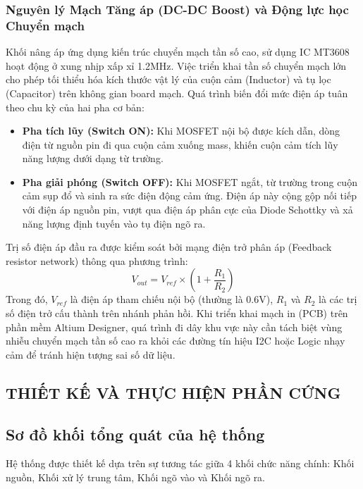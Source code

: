 \documentclass[12pt, a4paper, oneside]{article}
\begin{document}
\subsubsection{Nguyên lý Mạch Tăng áp (DC-DC Boost) và Động lực học Chuyển mạch}
Khối nâng áp ứng dụng kiến trúc chuyển mạch tần số cao, sử dụng IC MT3608 hoạt động ở xung nhịp xấp xỉ 1.2MHz. Việc triển khai tần số chuyển mạch lớn cho phép tối thiểu hóa kích thước vật lý của cuộn cảm (Inductor) và tụ lọc (Capacitor) trên không gian board mạch. Quá trình biến đổi mức điện áp tuân theo chu kỳ của hai pha cơ bản:
\begin{itemize}
    \item \textbf{Pha tích lũy (Switch ON):} Khi MOSFET nội bộ được kích dẫn, dòng điện từ nguồn pin đi qua cuộn cảm xuống mass, khiến cuộn cảm tích lũy năng lượng dưới dạng từ trường.
    \item \textbf{Pha giải phóng (Switch OFF):} Khi MOSFET ngắt, từ trường trong cuộn cảm sụp đổ và sinh ra sức điện động cảm ứng. Điện áp này cộng gộp nối tiếp với điện áp nguồn pin, vượt qua điện áp phân cực của Diode Schottky và xả năng lượng định tuyến vào tụ điện ngõ ra.
\end{itemize}

Trị số điện áp đầu ra được kiểm soát bởi mạng điện trở phân áp (Feedback resistor network) thông qua phương trình:
\begin{equation}
    V_{out} = V_{ref} \times \left(1 + \frac{R_1}{R_2}\right)
\end{equation}
Trong đó, $V_{ref}$ là điện áp tham chiếu nội bộ (thường là 0.6V), $R_1$ và $R_2$ là các trị số điện trở cấu thành trên nhánh phản hồi. Khi triển khai mạch in (PCB) trên phần mềm Altium Designer, quá trình đi dây khu vực này cần tách biệt vùng nhiễu chuyển mạch tần số cao ra khỏi các đường tín hiệu I2C hoặc Logic nhạy cảm để tránh hiện tượng sai số dữ liệu.

\newpage
\begin{center}
    \section{THIẾT KẾ VÀ THỰC HIỆN PHẦN CỨNG}
\end{center}
\subsection{Sơ đồ khối tổng quát của hệ thống}
Hệ thống được thiết kế dựa trên sự tương tác giữa 4 khối chức năng chính: Khối nguồn, Khối xử lý trung tâm, Khối ngõ vào và Khối ngõ ra.
\end{document}
